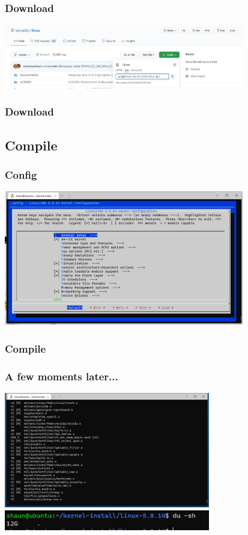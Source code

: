 \documentclass[aspectratio=169]{beamer}
\begin{document}
\begin{frame}
  \frametitle{Download}
  \centering\includegraphics[width=10.5cm]{github-kernel.jpg}
\end{frame}

\begin{frame}
  \frametitle{Download}
  
\end{frame}

\subsection{Compile}

\begin{frame}
  \frametitle{Config}
  \centering\includegraphics[width=10.5cm]{menuconfig.jpg}
\end{frame}

\begin{frame}
  \frametitle{Compile}
  
\end{frame}

\begin{frame}
  \frametitle{A few moments later...}
  \includegraphics[width=9cm]{make.jpg}
  \includegraphics[width=9cm]{du-sh.jpg}
\end{frame}
\end{document}
